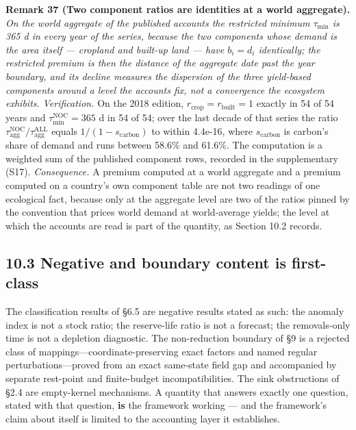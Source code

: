 \documentclass[11pt]{article}
\begin{document}
\textbf{Remark 37 (Two component ratios are identities at a world aggregate).} \emph{On the world aggregate of the published accounts the restricted minimum \(\tau_{\min}\) is 365 d in every year of the series, because the two components whose demand is the area itself --- cropland and built-up land --- have \(b_i = d_i\) identically; the restricted premium is then the distance of the aggregate date past the year boundary, and its decline measures the dispersion of the three yield-based components around a level the accounts fix, not a convergence the ecosystem exhibits.} \emph{Verification.} On the 2018 edition, \(r_{\mathrm{crop}} =\allowbreak{} r_{\mathrm{built}} =\allowbreak{} 1\) exactly in 54 of 54 years and \(\tau_{\min}^{\mathrm{NOC}} =\allowbreak{} 365\) d in 54 of 54; over the last decade of that series the ratio \(\tau_{\mathrm{agg}}^{\mathrm{NOC}}/\tau_{\mathrm{agg}}^{\mathrm{ALL}}\) equals \(1/(1-s_{\mathrm{carbon}})\) to within 4.4e-16, where \(s_{\mathrm{carbon}}\) is carbon's share of demand and runs between 58.6\% and 61.6\%. The computation is a weighted sum of the published component rows, recorded in the supplementary (S17). \emph{Consequence.} A premium computed at a world aggregate and a premium computed on a country's own component table are not two readings of one ecological fact, because only at the aggregate level are two of the ratios pinned by the convention that prices world demand at world-average yields; the level at which the accounts are read is part of the quantity, as Section 10.2 records.

\subsection*{10.3 Negative and boundary content is first-class}\label{103-negative-and-boundary-content-is-first-class}

The classification results of \S6.5 are negative results stated as such: the anomaly index is not a stock ratio; the reserve-life ratio is not a forecast; the removals-only time is not a depletion diagnostic. The non-reduction boundary of \S9 is a rejected class of mappings---coordinate-preserving exact factors and named regular perturbations---proved from an exact same-state field gap and accompanied by separate rest-point and finite-budget incompatibilities. The sink obstructions of \S2.4 are empty-kernel mechanisms. A quantity that answers exactly one question, stated with that question, \textbf{is} the framework working --- and the framework's claim about itself is limited to the accounting layer it establishes.
\end{document}
